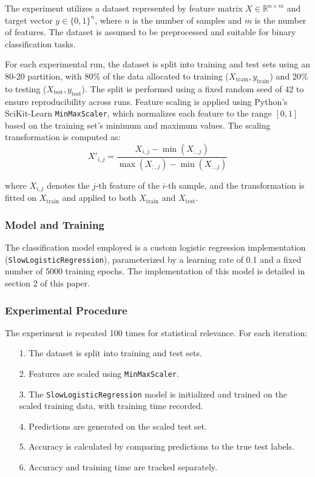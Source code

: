 \documentclass{article}
\theoremstyle{plain}
\theoremstyle{definition}
\theoremstyle{remark}
\begin{document}
The experiment utilizes a dataset represented by feature matrix $ X \in \mathbb{R}^{n \times m} $ and target vector $ y \in \{0, 1\}^n $, where $ n $ is the number of samples and $ m $ is the number of features. The dataset is assumed to be preprocessed and suitable for binary classification tasks.

For each experimental run, the dataset is split into training and test sets using an 80-20 partition, with 80\% of the data allocated to training ($ X_{\text{train}}, y_{\text{train}} $) and 20\% to testing ($ X_{\text{test}}, y_{\text{test}} $). The split is performed using a fixed random seed of 42 to ensure reproducibility across runs. Feature scaling is applied using Python's SciKit-Learn \texttt{MinMaxScaler}, which normalizes each feature to the range $[0, 1]$ based on the training set's minimum and maximum values. The scaling transformation is computed as:
$$
X'_{i,j} = \frac{X_{i,j} - \min(X_{:,j})}{\max(X_{:,j}) - \min(X_{:,j})}
$$

where $ X_{i,j} $ denotes the $ j $-th feature of the $ i $-th sample, and the transformation is fitted on $ X_{\text{train}} $ and applied to both $ X_{\text{train}} $ and $ X_{\text{test}} $.


\subsubsection{Model and Training}

The classification model employed is a custom logistic regression implementation (\texttt{SlowLogisticRegression}), parameterized by a learning rate of 0.1 and a fixed number of 5000 training epochs. The implementation of this model is detailed in section 2 of this paper.


\subsubsection{Experimental Procedure}

The experiment is repeated 100 times for statistical relevance. For each iteration:

\begin{itemize}
 \item [1.] The dataset is split into training and test sets.
 \item [2.] Features are scaled using \texttt{MinMaxScaler}.
 \item [3.] The \texttt{SlowLogisticRegression} model is initialized and trained on the scaled training data, with training time recorded.
 \item [4.] Predictions are generated on the scaled test set.
 \item [5.] Accuracy is calculated by comparing predictions to the true test labels.
 \item [6.] Accuracy and training time are tracked separately.
\end{itemize}
\end{document}
